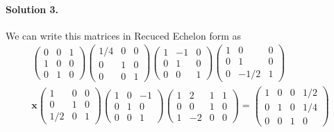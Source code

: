 \documentclass[11pt]{article}
\begin{document}
\paragraph{Solution 3.}We can write this matrices in Recuced Echelon form as
\begin{eqnarray*}
\begin{pmatrix}
0 & 0 & 1\\
1 & 0 & 0\\
0 & 1 & 0
\end{pmatrix}
\begin{pmatrix}
1/4 & 0 & 0\\
0 & 1 & 0\\
0 & 0 & 1
\end{pmatrix}
\begin{pmatrix}
1 & -1 & 0\\
0 & 1 & 0\\
0 & 0 & 1
\end{pmatrix}
\begin{pmatrix}
1 & 0 & 0\\
0 & 1 & 0\\
0 & -1/2 & 1
\end{pmatrix}
\\ \mathbf{x}
\begin{pmatrix}
1 & 0 & 0\\
0 & 1 & 0\\
1/2 & 0 & 1 
\end{pmatrix}
\begin{pmatrix}
1 & 0 & -1\\
0 & 1 & 0\\
0 & 0 & 1
\end{pmatrix}
\left(\begin{array}{ccc|c}  
	1 & 2 & 1 & 1 \\
    0 & 0 & 1 & 0 \\
    1 & -2 & 0 & 0
\end{array}\right)
=
\left(\begin{array}{ccc|c}  
	1 & 0 & 0 & 1/2 \\
    0 & 1 & 0 & 1/4 \\
    0 & 0 & 1 & 0
\end{array}\right)
\end{eqnarray*}
\end{document}

